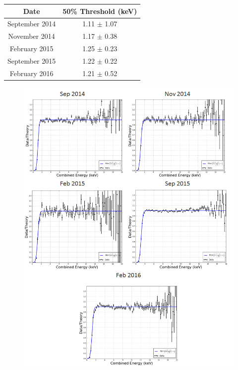 \begin{center}
\begin{tabular}{| c | c |} 
\hline
Date & 50\% Threshold (keV)  \\ \hline \hline
September 2014 & 1.11  $\pm$ 1.07 \\ \hline
November 2014 & 1.17 $\pm$ 0.38  \\ \hline
February 2015 & 1.25 $\pm$ 0.23  \\ \hline
September 2015 & 1.22 $\pm$ 0.22  \\ \hline
February 2016 & 1.21 $\pm$ 0.52  \\ 
\hline
\end{tabular}
\label{ThreshTable}
\end{center}


\begin{figure}[!h]
\includegraphics[scale=0.7]{Run04Corrections/KrypCal_2p22_Threshold.png}
 \label{Thresholds}
\end{figure}


